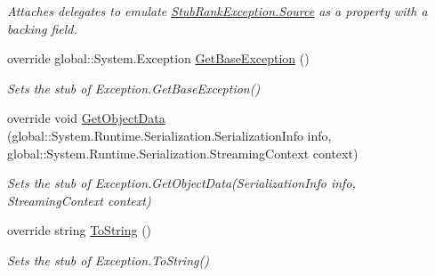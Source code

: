 \begin{DoxyCompactItemize}
\begin{DoxyCompactList}\small\item\em Attaches delegates to emulate \hyperlink{class_system_1_1_fakes_1_1_stub_rank_exception_ac5a2b6b8c7d6830db51b9bf8dd8af24a}{Stub\-Rank\-Exception.\-Source} as a property with a backing field.\end{DoxyCompactList}\item 
override global\-::\-System.\-Exception \hyperlink{class_system_1_1_fakes_1_1_stub_rank_exception_acbbf37e744c1c997a18bf2454a50bd99}{Get\-Base\-Exception} ()
\begin{DoxyCompactList}\small\item\em Sets the stub of Exception.\-Get\-Base\-Exception()\end{DoxyCompactList}\item 
override void \hyperlink{class_system_1_1_fakes_1_1_stub_rank_exception_a79394e61ea4037a36b498c8ba5740e2f}{Get\-Object\-Data} (global\-::\-System.\-Runtime.\-Serialization.\-Serialization\-Info info, global\-::\-System.\-Runtime.\-Serialization.\-Streaming\-Context context)
\begin{DoxyCompactList}\small\item\em Sets the stub of Exception.\-Get\-Object\-Data(\-Serialization\-Info info, Streaming\-Context context)\end{DoxyCompactList}\item 
override string \hyperlink{class_system_1_1_fakes_1_1_stub_rank_exception_a6f09d4785ba0fb2b898deacd7a6504c4}{To\-String} ()
\begin{DoxyCompactList}\small\item\em Sets the stub of Exception.\-To\-String()\end{DoxyCompactList}\end{DoxyCompactItemize}
